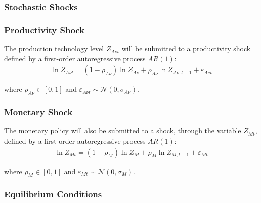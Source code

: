 \documentclass[
	thesis.tex
	]{subfiles}
\begin{document}

\subsubsection{Stochastic Shocks}\label{sec:reg-stochastic-shocks}

\subsubsection*{Productivity Shock} \label{sec:reg-productivity-shock}

The production technology level $Z_{A\nu t}$ will be submitted to a productivity shock defined by a first-order autoregressive process $AR(1)$:
\begin{align}
	\ln{Z_{A\nu t}} = (1-\rho_{A\nu})\ln{Z_{A\nu}} + \rho_{A\nu}\ln{Z_{A\nu,t-1}} + \varepsilon_{A\nu t} \label{eq:reg-productivity-shock}
\end{align}

where $\rho_{A\nu} \in [0,1]$ and $\varepsilon_{A\nu t} \sim \mathscr{N}(0,\sigma_{A\nu})$.

\subsubsection*{Monetary Shock} \label{sec:reg-monetary-shock}

The monetary policy will also be submitted to a shock, through the variable $Z_{Mt}$, defined by a first-order autoregressive process $AR(1)$:
\begin{align}
	\ln{Z_{Mt}} = (1-\rho_M)\ln{Z_{M}} + \rho_M\ln{Z_{M,t-1}} + \varepsilon_{Mt} \label{eq:reg-monetary-shock}
\end{align}

where $\rho_M \in [0,1]$ and $\varepsilon_{Mt} \sim \mathscr{N}(0,\sigma_M)$.


\subsubsection{Equilibrium Conditions}

\end{document}
